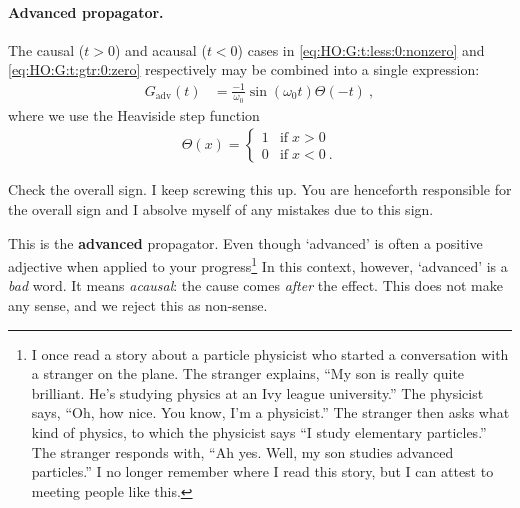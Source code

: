 \paragraph{Advanced propagator.}
The causal ($t>0$) and acausal ($t<0$) cases in \eqref{eq:HO:G:t:less:0:nonzero} and \eqref{eq:HO:G:t:gtr:0:zero} respectively may be combined into a single expression:
\begin{align}
  G_\text{adv}(t) &= \frac{-1}{\omega_0}\sin(\omega_0t) \Theta(-t) \ ,
  \label{eq:HO:G:adv:theta}
\end{align}
where we use the Heaviside step function
\begin{align}
  \Theta(x) = 
  \begin{cases}
  1 & \text{if}\; x>0\\
  0 & \text{if}\; x<0 \ .
  \end{cases}
  \label{eq:Heaviside:Theta}
\end{align}
\begin{exercise}
Check the overall sign. I keep screwing this up. You are henceforth responsible for the overall sign and I absolve myself of any mistakes due to this sign.
\end{exercise}
This is the \textbf{advanced} propagator. Even though `advanced' is often a positive adjective when applied to your progress\footnote{I once read a story about a particle physicist who started a conversation with a stranger on the plane. The stranger explains, ``My son is really quite brilliant. He's studying physics at an Ivy league university.'' The physicist says, ``Oh, how nice. You know, I'm a physicist.''  The stranger then asks what kind of physics, to which the physicist says ``I study elementary particles.'' The stranger responds with, ``Ah yes. Well, my son studies advanced particles.'' I no longer remember where I read this story, but I can attest to meeting people like this.} In this context, however, `advanced' is a \emph{bad} word. It means \emph{acausal}: the cause comes \emph{after} the effect. This does not make any sense, and we reject this as non-sense. 


